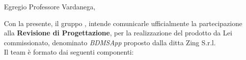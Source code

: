 \documentclass[10pt,a4paper,sans]{moderncv}        %
\begin{document}
\date{\emph{2015-04-20}}
\opening{Egregio Professore Vardanega,}
\makelettertitle

Con la presente, il gruppo \groupName{}, intende comunicarle ufficialmente la partecipazione alla \textbf{Revisione di Progettazione}, per la realizzazione del prodotto da Lei commissionato, denominato \textit{BDMSApp} proposto dalla ditta Zing S.r.l.\\
Il team è formato dai seguenti componenti: 
\end{document}
